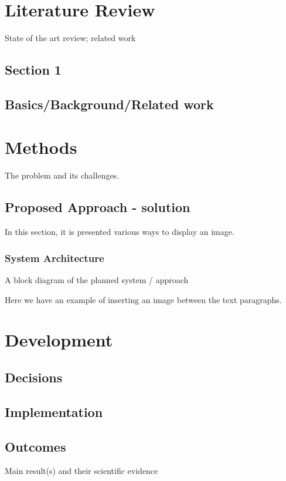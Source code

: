 \documentclass[
  oneside,
  11pt, a4paper,
  footinclude=true,
  headinclude=true,
  cleardoublepage=empty
]{scrbook}
\begin{document}
	\chapter{Literature Review}
		State of the art review; related work
        
        
        \section{Section 1}

        
        \section{Basics/Background/Related work}



	\chapter{Methods}
	         The problem and its challenges.

	\section{Proposed Approach - solution}
	In this section, it is presented various ways to display an image.
     \subsection{System Architecture}
     A block diagram of the planned system / approach

	Here we have an example of inserting an image between the text paragraphs.
	
	\chapter{Development}
		
	\section{Decisions}
    \section{Implementation}
    \section{Outcomes}
    Main result(s) and their scientific evidence
\end{document}
